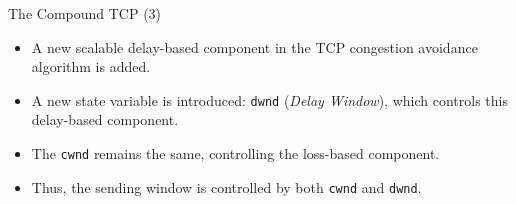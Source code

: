 \begin{frame}{The Compound TCP (3)}
        \begin{itemize}
		\item A new scalable delay-based component in the 
		      TCP congestion avoidance algorithm is added. 
		\item A new state variable is introduced: \texttt{dwnd} 
		      (\textit{Delay Window}), which controls this delay-based component.
		\item The \texttt{cwnd} remains the same, controlling the loss-based component. 
		\item Thus, the sending window is controlled by both \texttt{cwnd} and \texttt{dwnd}.
	
        \end{itemize}
\end{frame}

